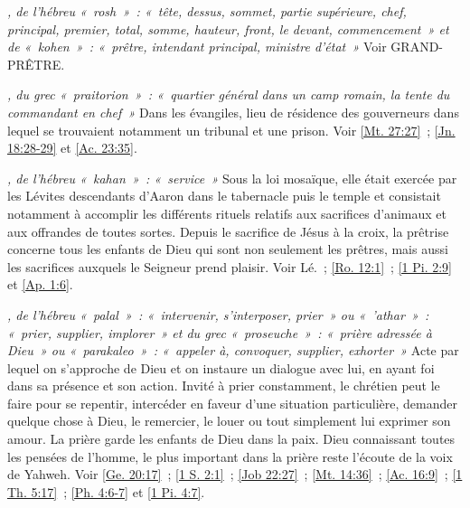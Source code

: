\begin{multicols}{2}
\textit{, de l'hébreu «~rosh~»~: «~tête, dessus, sommet, partie supérieure, chef, principal, premier, total, somme, hauteur, front, le devant, commencement~» et de «~kohen~»~: «~prêtre, intendant principal, ministre d'état~»}\newline
Voir GRAND-PRÊTRE.

\textit{, du grec «~praitorion~»~: «~quartier général dans un camp romain, la tente du commandant en chef~»}\newline
Dans les évangiles, lieu de résidence des gouverneurs dans lequel se trouvaient notamment un tribunal et une prison. Voir \vref{Mt. 27:27}~; \vref{Jn. 18:28-29} et \vref{Ac. 23:35}.

\textit{, de l'hébreu «~kahan~»~: «~service~»}\newline
Sous la loi mosaïque, elle était exercée par les Lévites descendants d'Aaron dans le tabernacle puis le temple et consistait notamment à accomplir les différents rituels relatifs aux sacrifices d'animaux et aux offrandes de toutes sortes. Depuis le sacrifice de Jésus à la croix, la prêtrise concerne tous les enfants de Dieu qui sont non seulement les prêtres, mais aussi les sacrifices auxquels le Seigneur prend plaisir. Voir Lé.~; \vref{Ro. 12:1}~; \vref{1 Pi. 2:9} et \vref{Ap. 1:6}.

\textit{, de l'hébreu «~palal~»~: «~intervenir, s'interposer, prier~» ou «~'athar~»~: «~prier, supplier, implorer~» et du grec «~proseuche~»~: «~prière adressée à Dieu~» ou «~parakaleo~»~: «~appeler à, convoquer, supplier, exhorter~»}\newline
Acte par lequel on s'approche de Dieu et on instaure un dialogue avec lui, en ayant foi dans sa présence et son action. Invité à prier constamment, le chrétien peut le faire pour se repentir, intercéder en faveur d'une situation particulière, demander quelque chose à Dieu, le remercier, le louer ou tout simplement lui exprimer son amour. La prière garde les enfants de Dieu dans la paix. Dieu connaissant toutes les pensées de l'homme, le plus important dans la prière reste l'écoute de la voix de Yahweh. Voir \vref{Ge. 20:17}~; \vref{1 S. 2:1}~; \vref{Job 22:27}~; \vref{Mt. 14:36}~; \vref{Ac. 16:9}~; \vref{1 Th. 5:17}~; \vref{Ph. 4:6-7} et \vref{1 Pi. 4:7}.


\end{multicols}
